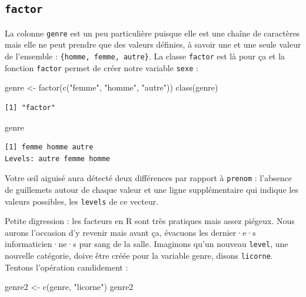 \documentclass[
  letterpaper,
  DIV=11,
  numbers=noendperiod]{scrreprt}
\newenvironment{Shaded}{\begin{snugshade}}{\end{snugshade}}
\newcommand{\FunctionTok}[1]{\textcolor[rgb]{0.28,0.35,0.67}{#1}}
\newcommand{\NormalTok}[1]{\textcolor[rgb]{0.00,0.23,0.31}{#1}}
\newcommand{\OtherTok}[1]{\textcolor[rgb]{0.00,0.23,0.31}{#1}}
\newcommand{\StringTok}[1]{\textcolor[rgb]{0.13,0.47,0.30}{#1}}
\begin{document}
\hypertarget{factor}{%
\subsection{\texorpdfstring{\texttt{factor}}{factor}}\label{factor}}

La colonne \texttt{genre} est un peu particulière puisque elle est une
chaîne de caractères mais elle ne peut prendre que des valeurs définies,
à savoir une et une seule valeur de l'ensemble :
\texttt{\{homme,\ femme,\ autre\}}. La classe \texttt{factor} est là
pour ça et la fonction \texttt{factor} permet de créer notre variable
\texttt{sexe} :

\begin{Shaded}
\begin{Highlighting}[]
\NormalTok{genre }\OtherTok{\textless{}{-}} \FunctionTok{factor}\NormalTok{(}\FunctionTok{c}\NormalTok{(}\StringTok{"femme"}\NormalTok{, }\StringTok{"homme"}\NormalTok{, }\StringTok{"autre"}\NormalTok{))}
\FunctionTok{class}\NormalTok{(genre)}
\end{Highlighting}
\end{Shaded}

\begin{verbatim}
[1] "factor"
\end{verbatim}

\begin{Shaded}
\begin{Highlighting}[]
\NormalTok{genre}
\end{Highlighting}
\end{Shaded}

\begin{verbatim}
[1] femme homme autre
Levels: autre femme homme
\end{verbatim}

Votre œil aiguisé aura détecté deux différences par rapport à
\texttt{prenom} : l'absence de guillemets autour de chaque valeur et une
ligne supplémentaire qui indique les valeurs possibles, les
\texttt{levels} de ce vecteur.

Petite digression : les facteurs en R sont très pratiques mais assez
piégeux. Nous aurons l'occasion d'y revenir mais avant ça, évacuons les
dernier·e·s informaticien·ne·s pur sang de la salle. Imaginons qu'un
nouveau \texttt{level}, une nouvelle catégorie, doive être créée pour la
variable genre, disons \texttt{licorne}. Tentons l'opération candidement
:

\begin{Shaded}
\begin{Highlighting}[]
\NormalTok{genre2 }\OtherTok{\textless{}{-}} \FunctionTok{c}\NormalTok{(genre, }\StringTok{"licorne"}\NormalTok{)}
\NormalTok{genre2}
\end{Highlighting}
\end{Shaded}
\end{document}
